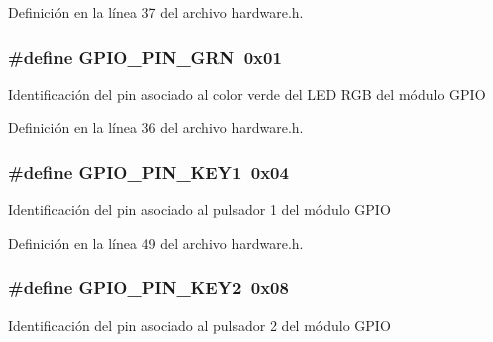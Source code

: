 Definición en la línea 37 del archivo hardware.\+h.

\subsubsection[{\texorpdfstring{G\+P\+I\+O\+\_\+\+P\+I\+N\+\_\+\+G\+RN}{GPIO_PIN_GRN}}]{\setlength{\rightskip}{0pt plus 5cm}\#define G\+P\+I\+O\+\_\+\+P\+I\+N\+\_\+\+G\+RN~0x01}\hypertarget{group__hardware_ga8ce252c71154210c65808a2170d74223}{}\label{group__hardware_ga8ce252c71154210c65808a2170d74223}
Identificación del pin asociado al color verde del L\+ED R\+GB del módulo G\+P\+IO 

Definición en la línea 36 del archivo hardware.\+h.

\subsubsection[{\texorpdfstring{G\+P\+I\+O\+\_\+\+P\+I\+N\+\_\+\+K\+E\+Y1}{GPIO_PIN_KEY1}}]{\setlength{\rightskip}{0pt plus 5cm}\#define G\+P\+I\+O\+\_\+\+P\+I\+N\+\_\+\+K\+E\+Y1~0x04}\hypertarget{group__hardware_ga26fa1a6916e027dcfa2d5a76c18dccb4}{}\label{group__hardware_ga26fa1a6916e027dcfa2d5a76c18dccb4}
Identificación del pin asociado al pulsador 1 del módulo G\+P\+IO 

Definición en la línea 49 del archivo hardware.\+h.

\subsubsection[{\texorpdfstring{G\+P\+I\+O\+\_\+\+P\+I\+N\+\_\+\+K\+E\+Y2}{GPIO_PIN_KEY2}}]{\setlength{\rightskip}{0pt plus 5cm}\#define G\+P\+I\+O\+\_\+\+P\+I\+N\+\_\+\+K\+E\+Y2~0x08}\hypertarget{group__hardware_ga6fe528c749e6e3df18c66c78841fd2ae}{}\label{group__hardware_ga6fe528c749e6e3df18c66c78841fd2ae}
Identificación del pin asociado al pulsador 2 del módulo G\+P\+IO 

